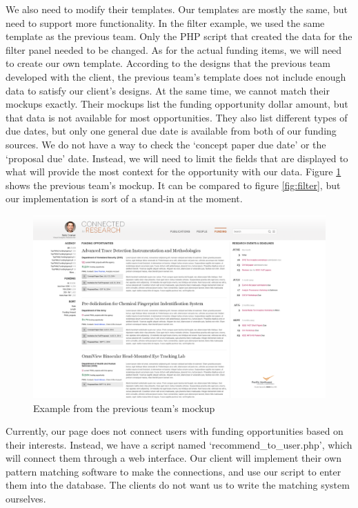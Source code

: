 \documentclass[onecolumn]{IEEEtran}
\begin{document}
We also need to modify their templates. Our templates are mostly the same, but need to support more functionality. In the filter example, we used the same template as the previous team. Only the PHP script that created the data for the filter panel needed to be changed. As for the actual funding items, we will need to create our own template. According to the designs that the previous team developed with the client, the previous team's template does not include enough data to satisfy our client's designs. At the same time, we cannot match their mockups exactly. Their mockups list the funding opportunity dollar amount, but that data is not available for most opportunities. They also list different types of due dates, but only one general due date is available from both of our funding sources. We do not have a way to check the `concept paper due date' or the `proposal due' date. Instead, we will need to limit the fields that are displayed to what will provide the most context for the opportunity with our data. Figure \ref{fig:mockup} shows the previous team's mockup. It can be compared to figure \ref{fig:filter}, but our implementation is sort of a stand-in at the moment.

\begin{figure}
    \centering
    \includegraphics[width=1.0\textwidth]{funding-default-view.png}
    \caption{Example from the previous team's mockup}
    \label{fig:mockup}
\end{figure}

Currently, our page does not connect users with funding opportunities based on their interests. Instead, we have a script named `recommend\_to\_user.php', which will connect them through a web interface. Our client will implement their own pattern matching software to make the connections, and use our script to enter them into the database. The clients do not want us to write the matching system ourselves.
\end{document}
